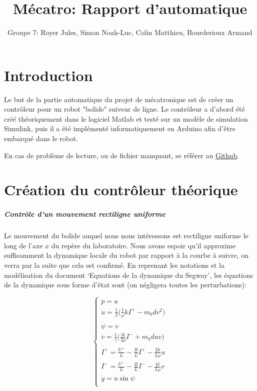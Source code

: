 \documentclass{report}
\title{Mécatro: Rapport d'automatique}
\author{Groupe 7: Royer Jules, Simon Noah-Luc, Colin Matthieu, Bourderioux Armand}
\date{}
\begin{document}
\maketitle

\tableofcontents

\chapter{Introduction}
Le but de la partie automatique du projet de mécatronique est de créer un contrôleur
pour un robot "bolide" suiveur de ligne. Le contrôleur a d'abord été créé théoriquement
dans le logiciel Matlab et testé sur un modèle de simulation Simulink, puis il a été
implémenté informatiquement en Arduino afin d'être embarqué dans le robot.

En cas de problème de lecture, ou de fichier manquant, se référer au 
\href{https://github.com/SushiOfDestiny/PI_MECATRO_Vroum_Vroum}{Github}.

\nopagebreak

\chapter{Création du contrôleur théorique}

\paragraph{Contrôle d'un mouvement rectiligne uniforme}

Le mouvement du bolide auquel nous nous intéressons est rectiligne uniforme le long de l'axe $x$ du repère du laboratoire.
Nous avons espoir qu'il approxime suffisamment la dynamique locale du robot par rapport à la courbe à suivre, on
verra par la suite que cela est confirmé.
En reprenant les notations et la modélisation du document `Equations de la dynamique du Segway',
les équations de la dynamique sous forme d'état sont (on négligera toutes les perturbations):

\begin{equation*}
    \begin{cases}
        \dot{p} = u \\
        \dot{u} = \frac{1}{\beta}\big( \frac{1}{\rho}kI^{+} - m_bdv^2 \big) \\
        \dot{\psi} = v \\
        \dot{v} = \frac{1}{\gamma}\big( \frac{lk}{2\rho}I^{-} + m_bduv \big) \\
        \dot{I^{+}} = \frac{U^{+}}{L} - \frac{R}{L}I^{+} - \frac{2k}{L\rho}u \\
        \dot{I^{-}} = \frac{U^{-}}{L} - \frac{R}{L}I^{-} - \frac{kl}{L\rho}v \\
        \dot{y} = u\sin\psi \\
    \end{cases}
\end{equation*}
\end{document}
